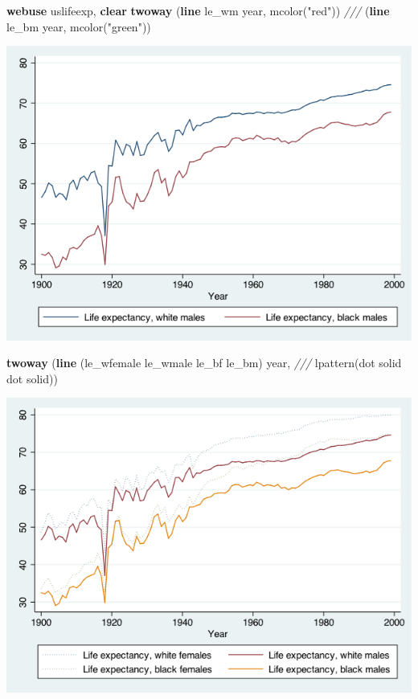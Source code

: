 \documentclass[
]{book}
\newenvironment{Shaded}{\begin{snugshade}}{\end{snugshade}}
\newcommand{\BaseNTok}[1]{\textcolor[rgb]{0.00,0.00,0.81}{#1}}
\newcommand{\CommentTok}[1]{\textcolor[rgb]{0.56,0.35,0.01}{\textit{#1}}}
\newcommand{\FunctionTok}[1]{\textcolor[rgb]{0.00,0.00,0.00}{#1}}
\newcommand{\KeywordTok}[1]{\textcolor[rgb]{0.13,0.29,0.53}{\textbf{#1}}}
\newcommand{\NormalTok}[1]{#1}
\newcommand{\StringTok}[1]{\textcolor[rgb]{0.31,0.60,0.02}{#1}}
\begin{document}
\begin{Shaded}
\begin{Highlighting}[]
\KeywordTok{webuse}\NormalTok{ uslifeexp, }\KeywordTok{clear}
\KeywordTok{twoway}\NormalTok{ (}\KeywordTok{line}\NormalTok{ le\_wm }\FunctionTok{year}\NormalTok{, mcolor(}\StringTok{"red"}\NormalTok{)) }\CommentTok{///}
\NormalTok{       (}\KeywordTok{line}\NormalTok{ le\_bm }\FunctionTok{year}\NormalTok{, mcolor(}\StringTok{"green"}\NormalTok{))}
\end{Highlighting}
\end{Shaded}

\includegraphics{Stata/StataGraphics/images/linegraph1.png}

\begin{Shaded}
\begin{Highlighting}[]
\KeywordTok{twoway}\NormalTok{ (}\KeywordTok{line}\NormalTok{ (le\_wfemale le\_wmale le\_bf le\_bm) }\FunctionTok{year}\NormalTok{, }\CommentTok{///}
\NormalTok{       lpattern(}\BaseNTok{dot}\NormalTok{ solid }\BaseNTok{dot}\NormalTok{ solid))}
\end{Highlighting}
\end{Shaded}

\includegraphics{Stata/StataGraphics/images/linegraph2.png}
\end{document}
